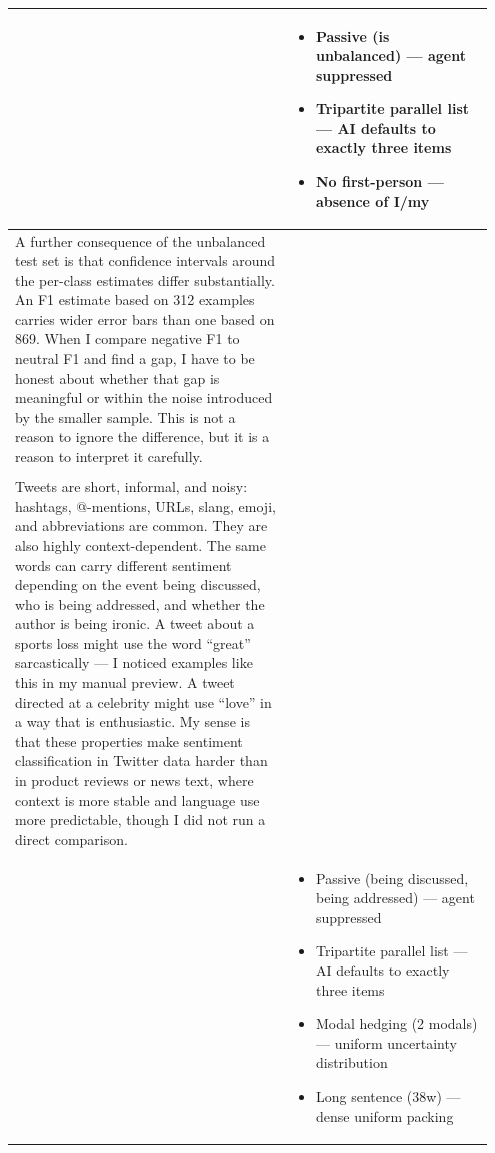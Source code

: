 \documentclass[11pt]{article}
\begin{document}
\begin{longtable}{|p{0.55\linewidth}|p{0.40\linewidth}|}
\hline
\rule[-3.5cm]{0pt}{3.5cm} & \begin{itemize}[leftmargin=1em,itemsep=1pt,topsep=1pt,parsep=0pt]
  \item Passive (is unbalanced) --- agent suppressed
  \item Tripartite parallel list --- AI defaults to exactly three items
  \item No first-person --- absence of I/my
\end{itemize} \\
\hline
A further consequence of the unbalanced test set is that confidence intervals around the per-class estimates differ substantially. An F1 estimate based on 312 examples carries wider error bars than one based on 869. When I compare negative F1 to neutral F1 and find a gap, I have to be honest about whether that gap is meaningful or within the noise introduced by the smaller sample. This is not a reason to ignore the difference, but it is a reason to interpret it carefully. & \\[2pt]
\hline
\rule[-3.5cm]{0pt}{3.5cm} &  \\
\hline
Tweets are short, informal, and noisy: hashtags, @-mentions, URLs, slang, emoji, and abbreviations are common. They are also highly context-dependent. The same words can carry different sentiment depending on the event being discussed, who is being addressed, and whether the author is being ironic. A tweet about a sports loss might use the word ``great'' sarcastically --- I noticed examples like this in my manual preview. A tweet directed at a celebrity might use ``love'' in a way that is enthusiastic. My sense is that these properties make sentiment classification in Twitter data harder than in product reviews or news text, where context is more stable and language use more predictable, though I did not run a direct comparison. & \\[2pt]
\hline
\rule[-3.5cm]{0pt}{3.5cm} & \begin{itemize}[leftmargin=1em,itemsep=1pt,topsep=1pt,parsep=0pt]
  \item Passive (being discussed, being addressed) --- agent suppressed
  \item Tripartite parallel list --- AI defaults to exactly three items
  \item Modal hedging (2 modals) --- uniform uncertainty distribution
  \item Long sentence (38w) --- dense uniform packing
\end{itemize} \\

\end{longtable}
\end{document}
